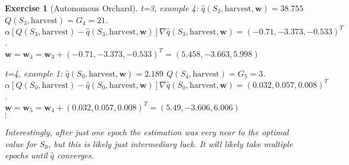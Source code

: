 \documentclass[a4paper]{scrartcl}
\theoremstyle{nonumberplain}
\newtheorem{ex}{Exercise}
\begin{document}
\begin{ex}[Autonomous Orchard]
t=3, example 4: $\hat{q}(S_3,\text{harvest},\textbf{w})=38.755$ $Q(S_3, \text{harvest})=G_4=21$.\\
$\alpha [Q(S_3, \text{harvest})-\hat{q}(S_3,\text{harvest},\textbf{w})] \nabla \hat{q}(S_3,\text{harvest},\textbf{w})=(-0.71,-3.373,-0.533)^T$.\\
$\textbf{w}=\textbf{w}_{4}= \textbf{w}_{3} + (-0.71,-3.373,-0.533)^T=(5.458,-3.663,5.998)$

t=4, example 1: $\hat{q}(S_0,\text{harvest},\textbf{w})=2.189$ $Q(S_4, \text{harvest})=G_5=3$.\\
$\alpha [Q(S_0, \text{harvest})-\hat{q}(S_0,\text{harvest},\textbf{w})] \nabla \hat{q}(S_0,\text{harvest},\textbf{w})=(0.032,0.057,0.008)^T$.\\
$\textbf{w}=\textbf{w}_{5}= \textbf{w}_{4} + (0.032,0.057,0.008)^T=(5.49,-3.606,6.006)$\\

$\vdots$

Interestingly, after just one epoch the estimation was very near to the optimal value for $S_0$, but this is likely just intermediary luck. It will likely take multiple epochs until $\hat{q}$ converges.

\end{ex}
\end{document}

